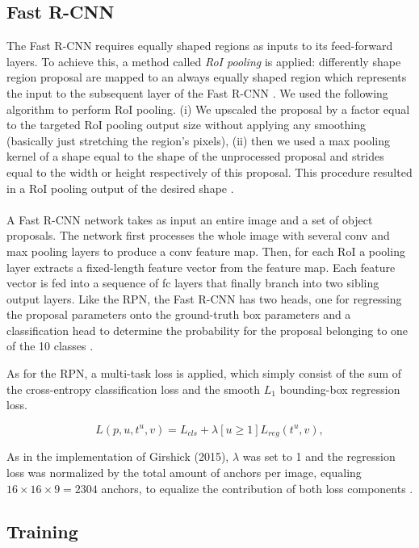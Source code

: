 \documentclass[a4paper]{article}
\begin{document}
\subsection{Fast R-CNN}
The Fast R-CNN requires equally shaped regions as inputs to its feed-forward layers. To achieve this, a method called \emph{RoI pooling} \cite{fastrcnn} is applied: differently shape region proposal are mapped to an always equally shaped region which represents the input to the subsequent layer of the Fast R-CNN \cite{fastrcnn}. We used the following algorithm to perform RoI pooling. (i) We upscaled the proposal by a factor equal to the targeted RoI pooling output size without applying any smoothing (basically just stretching the region's pixels), (ii) then we used a max pooling kernel of a shape equal to the shape of the unprocessed proposal and strides equal to the width or height respectively of this proposal. This procedure resulted in a RoI pooling output of the desired shape \cite{fastrcnn}.
\\
\\
A Fast R-CNN network takes as input an entire image and a set of object proposals. The network first processes the whole image with several conv and max pooling layers to produce a conv feature map. Then, for each RoI a pooling layer extracts a fixed-length feature vector from the feature map. Each feature vector is fed into a sequence of fc layers that finally branch into two sibling output layers. Like the RPN, the Fast R-CNN has two heads, one for regressing the proposal parameters onto the ground-truth box parameters and a classification head to determine the probability for the proposal belonging to one of the 10 classes \cite{fastrcnn}.

As for the RPN, a multi-task loss is applied, which simply consist of the sum of the cross-entropy classification loss and the smooth $L_1$ bounding-box regression loss.

$$L(p,u,t^u,v) = L_{cls} + \lambda[u \geq 1]L_{reg}(t^u,v),$$

\noindent As in the implementation of Girshick (2015), $\lambda$ was set to 1 and the regression loss was normalized by the total amount of anchors per image, equaling $16 \times 16 \times 9 = 2304$ anchors, to equalize the contribution of both loss components \cite{fastrcnn}.

\subsection{Training}
\end{document}
